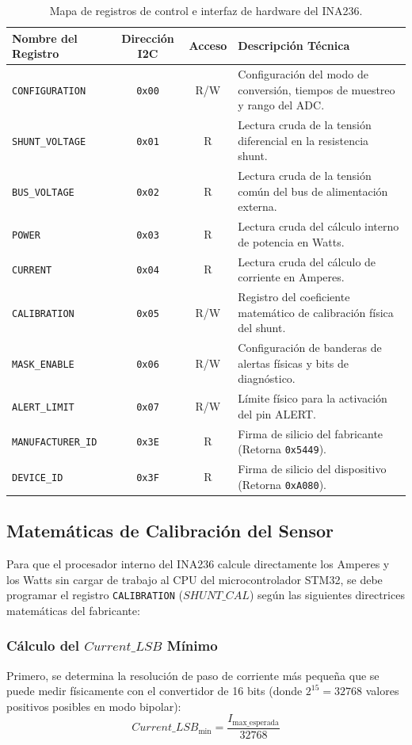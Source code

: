\documentclass[
10pt, %
a4paper, %
oneside, %
headinclude,footinclude, %
BCOR5mm, %
]{scrartcl}
\begin{document}
\begin{table}[H]
	\centering
	\begin{tabular}{lccp{7.5cm}}
		\toprule
		\textbf{Nombre del Registro} & \textbf{Dirección I2C} & \textbf{Acceso} & \textbf{Descripción Técnica} \\
		\midrule
		\texttt{CONFIGURATION} & \texttt{0x00} & R/W & Configuración del modo de conversión, tiempos de muestreo y rango del ADC. \\
		\texttt{SHUNT\_VOLTAGE} & \texttt{0x01} & R & Lectura cruda de la tensión diferencial en la resistencia shunt. \\
		\texttt{BUS\_VOLTAGE} & \texttt{0x02} & R & Lectura cruda de la tensión común del bus de alimentación externa. \\
		\texttt{POWER} & \texttt{0x03} & R & Lectura cruda del cálculo interno de potencia en Watts. \\
		\texttt{CURRENT} & \texttt{0x04} & R & Lectura cruda del cálculo de corriente en Amperes. \\
		\texttt{CALIBRATION} & \texttt{0x05} & R/W & Registro del coeficiente matemático de calibración física del shunt. \\
		\texttt{MASK\_ENABLE} & \texttt{0x06} & R/W & Configuración de banderas de alertas físicas y bits de diagnóstico. \\
		\texttt{ALERT\_LIMIT} & \texttt{0x07} & R/W & Límite físico para la activación del pin ALERT. \\
		\texttt{MANUFACTURER\_ID} & \texttt{0x3E} & R & Firma de silicio del fabricante (Retorna \texttt{0x5449}). \\
		\texttt{DEVICE\_ID} & \texttt{0x3F} & R & Firma de silicio del dispositivo (Retorna \texttt{0xA080}). \\
		\bottomrule
	\end{tabular}
	\caption{Mapa de registros de control e interfaz de hardware del INA236.}\label{tab_registers}
\end{table}

\subsection{Matemáticas de Calibración del Sensor}
Para que el procesador interno del INA236 calcule directamente los Amperes y los Watts sin cargar de trabajo al CPU del microcontrolador STM32, se debe programar el registro \texttt{CALIBRATION} ($SHUNT\_CAL$) según las siguientes directrices matemáticas del fabricante:

\subsubsection{Cálculo del $Current\_LSB$ Mínimo}
Primero, se determina la resolución de paso de corriente más pequeña que se puede medir físicamente con el convertidor de 16 bits (donde $2^{15} = 32768$ valores positivos posibles en modo bipolar):
\begin{equation}
	Current\_LSB_{\text{min}} = \frac{I_{\text{max\_esperada}}}{32768}
\end{equation}
\end{document}
